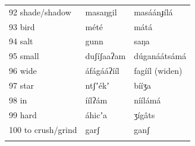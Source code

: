 \documentclass[output=paper]{langsci/langscibook}
\begin{document}
\begin{longtable}{p{}  p{} p{}}
92 shade/shadow & masaŋgil & masáánɟílá \\

93 bird & mété & mátá \\

94 salt & gunn & saŋa \\

95 small & duʃíʃaaʔam & d\'{u}ganáátsámá
\\

96 wide & áfágááʔííl & fagííl (widen) \\

97 star & ntʃʼékʼ & bííʒa \\

98 in & íílʔám & níílámá \\

99 hard & áhicʼa & ʒígâts \\

100 to crush/grind & garʃ & ganʃ \\
\lspbottomrule
\end{longtable}


\printbibliography[heading=subbibliography,notkeyword=this]
\end{document}
